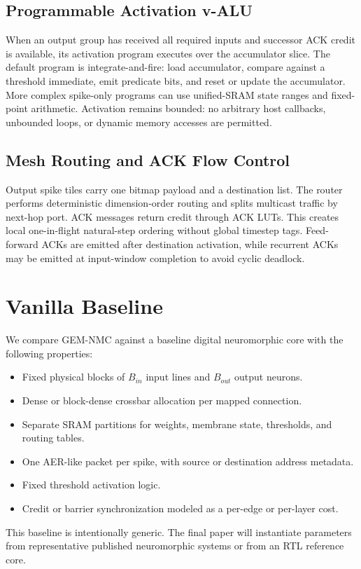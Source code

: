 \documentclass[10pt,conference]{IEEEtran}
\newcommand{\arch}{GEM-NMC}
\begin{document}
\subsection{Programmable Activation v-ALU}
When an output group has received all required inputs and successor ACK credit is available, its activation program executes over the accumulator slice. The default program is integrate-and-fire: load accumulator, compare against a threshold immediate, emit predicate bits, and reset or update the accumulator. More complex spike-only programs can use unified-SRAM state ranges and fixed-point arithmetic. Activation remains bounded: no arbitrary host callbacks, unbounded loops, or dynamic memory accesses are permitted.

\subsection{Mesh Routing and ACK Flow Control}
Output spike tiles carry one bitmap payload and a destination list. The router performs deterministic dimension-order routing and splits multicast traffic by next-hop port. ACK messages return credit through ACK LUTs. This creates local one-in-flight natural-step ordering without global timestep tags. Feed-forward ACKs are emitted after destination activation, while recurrent ACKs may be emitted at input-window completion to avoid cyclic deadlock.

\section{Vanilla Baseline}
We compare \arch{} against a baseline digital neuromorphic core with the following properties:
\begin{itemize}
    \item Fixed physical blocks of $B_{in}$ input lines and $B_{out}$ output neurons.
    \item Dense or block-dense crossbar allocation per mapped connection.
    \item Separate SRAM partitions for weights, membrane state, thresholds, and routing tables.
    \item One AER-like packet per spike, with source or destination address metadata.
    \item Fixed threshold activation logic.
    \item Credit or barrier synchronization modeled as a per-edge or per-layer cost.
\end{itemize}
This baseline is intentionally generic. The final paper will instantiate parameters from representative published neuromorphic systems or from an RTL reference core.
\end{document}
